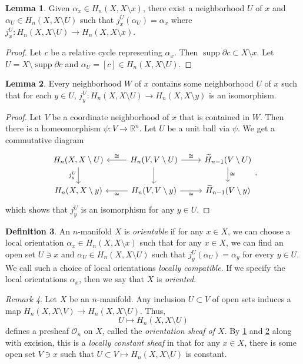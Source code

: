 \documentclass[10pt,letterpaper,cm]{nupset}
\theoremstyle{definition}
\newtheorem{definition}{Definition}[subsection]
\theoremstyle{theorem}
\newtheorem{lemma}[definition]{Lemma}
\theoremstyle{remark}
\newtheorem{remark}[definition]{Remark}
\newcommand{\R}{\mathbb{R}}
\newcommand{\1}{\mathbb{1}}
\newcommand{\0}{\vec 0}
\DeclareMathOperator{\supp}{supp}
\begin{document}
\begin{lemma}\label{lem}
Given $\alpha_x \in H_n(X, X\setminus x)$, there exist a neighborhood $U$ of $x$ and $\alpha_U \in H_n(X, X \setminus U)$ such that $j_x^U(\alpha_U) = \alpha_x$ where $j_x^U : H_n(X, X \setminus U) \to H_n(X, X \setminus x)$.
\end{lemma}
\begin{proof}
Let $c$ be a relative cycle representing $\alpha_x$. Then $\supp{\partial{c}} \subset X \setminus x$. Let $U = X \setminus \supp{\partial{c}}$ and $\alpha_U = [c] \in H_n(X, X\setminus U)$.
\end{proof}

\begin{lemma}\label{lem2}
Every neighborhood $W$ of $x$ contains some neighborhood $U$ of $x$ such that for each $y \in U$, $j_y^U : H_n(X, X\setminus U) \to H_n(X, X\setminus y)$ is an isomorphism. 
\end{lemma}
\begin{proof}
Let $V$ be a coordinate neighborhood of $x$ that is contained in $W$. Then there is a homeomorphism $\psi : V \to \R^n$. Let $U$ be a unit ball via $\psi$. We get a commutative diagram
\[
\begin{tikzcd}
{H_n(X, X \setminus U)} \arrow[d, "j_y^U"'] & {H_n(V, V \setminus U)} \arrow[l, "\cong"'] \arrow[d] \arrow[r, "\cong"] & \widetilde{H}_{n-1}(V \setminus U) \arrow[d, "\cong"] \\
{H_n(X, X\setminus y)}                      & {H_n(V, V \setminus y)} \arrow[l, "\cong"] \arrow[r, "\cong"']           & \widetilde{H}_{n-1}(V \setminus y)                   
\end{tikzcd}
,\] which shows that $j_y^U$ is an isomorphism for any $y \in U$.
\end{proof}

\begin{definition}
An  $n$-manifold $X$ is \textit{orientable} if for any $x\in X$, we can choose a local orientation $\alpha_x \in H_n(X, X \setminus x)$ such that for any $x\in X$, we can find an open set $U \ni x$ and $\alpha_U \in H_n(X, X \setminus U)$ such that $j_y^U(\alpha_U) = \alpha_y$ for every $y\in U$. We call such a choice of local orientations \textit{locally compatible}.  If we specify the local orientations $\alpha_x$, then we say that $X$ is \textit{oriented}. 
\end{definition}

\begin{remark}
Let $X$ be an $n$-manifold. Any inclusion $U \subset V$ of open sets induces a map $H_n(X, X \setminus V) \to H_n(X, X \setminus U)$. Thus, $$U \mapsto H_n(X, X \setminus U)$$ defines a presheaf $\mathcal{O}_n$ on $X$, called the \textit{orientation sheaf of $X$}. By \cref{lem} and \cref{lem2} along with excision, this is a \textit{locally constant sheaf} in that for any $x\in X$, there is some open set $V \ni x$ such that $U \subset V \mapsto H_n(X, X \setminus U)$ is constant.
\end{remark}
\end{document}
